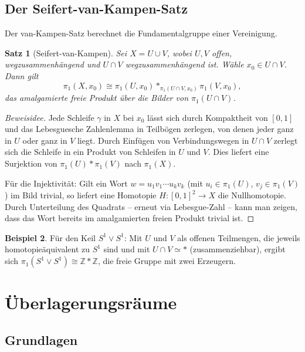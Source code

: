 \documentclass[12pt,a4paper]{amsart}
\newtheorem{theorem}{Satz}[section]
\theoremstyle{definition}
\newtheorem{example}[theorem]{Beispiel}
\begin{document}
\subsection{Der Seifert-van-Kampen-Satz}

Der van-Kampen-Satz berechnet die Fundamentalgruppe einer Vereinigung.

\begin{theorem}[Seifert-van-Kampen]
\label{thm:vankampen}
Sei $X = U \cup V$, wobei $U, V$ offen, wegzusammenh\"angend und
$U \cap V$ wegzusammenh\"angend ist. W\"ahle $x_0 \in U \cap V$. Dann gilt
\[
  \pi_1(X, x_0) \cong \pi_1(U, x_0) *_{\pi_1(U \cap V, x_0)} \pi_1(V, x_0),
\]
das \emph{amalgamierte freie Produkt} \"uber die Bilder von $\pi_1(U \cap V)$.
\end{theorem}
\begin{proof}[Beweisidee]
Jede Schleife $\gamma$ in $X$ bei $x_0$ l\"asst sich durch Kompaktheit von $[0,1]$
und das Lebesguesche Zahlenlemma in Teilb\"ogen zerlegen, von denen jeder ganz in
$U$ oder ganz in $V$ liegt. Durch Einf\"ugen von Verbindungswegen in $U \cap V$
zerlegt sich die Schleife in ein Produkt von Schleifen in $U$ und $V$. Dies liefert
eine Surjektion von $\pi_1(U) * \pi_1(V)$ nach $\pi_1(X)$.

F\"ur die Injektivit\"at: Gilt ein Wort $w = u_1 v_1 \cdots u_k v_k$ (mit
$u_i \in \pi_1(U)$, $v_j \in \pi_1(V)$) im Bild trivial, so liefert eine
Homotopie $H\colon [0,1]^2 \to X$ die Nullhomotopie. Durch Unterteilung des
Quadrats -- erneut via Lebesgue-Zahl -- kann man zeigen, dass das Wort bereits
im amalgamierten freien Produkt trivial ist.
\end{proof}

\begin{example}
F\"ur den Keil $S^1 \vee S^1$: Mit $U$ und $V$ als offenen Teilmengen, die
jeweils homotopie\"aquivalent zu $S^1$ sind und mit $U \cap V \simeq *$
(zusammenziehbar), ergibt sich
$\pi_1(S^1 \vee S^1) \cong \mathbb{Z} * \mathbb{Z}$,
die freie Gruppe mit zwei Erzeugern.
\end{example}

\section{\"Uberlagerungsr\"aume}
\label{sec:ueberlagerung}

\subsection{Grundlagen}
\end{document}
